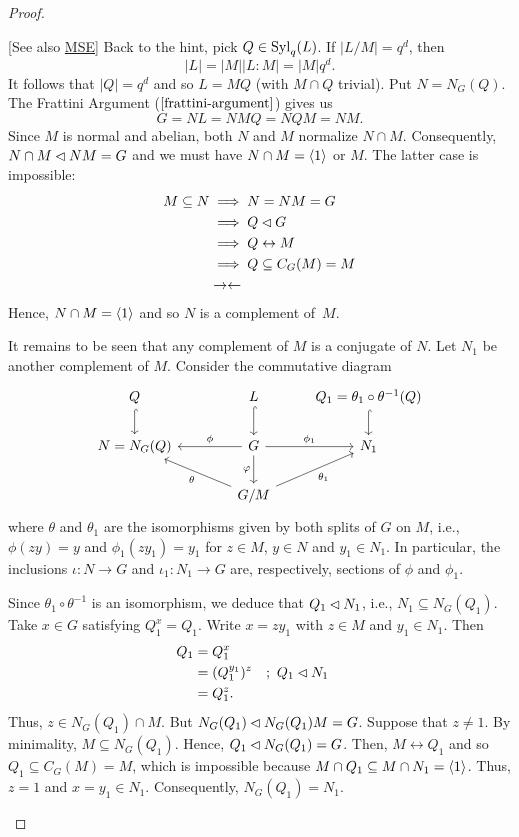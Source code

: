 \begin{proof}
\begin{solution} {[See also \href{https://math.stackexchange.com/a/617987/269050}{MSE}]}
Back to the hint, pick $Q\in{\rm Syl}_q(L)$. If $|L/M|=q^d$, then
$$
    |L| = |M||L:M| = |M|q^d.
$$
It follows that $|Q|=q^d$ and so $L=MQ$ (with $M\cap Q$ trivial). Put $N=N_G(Q)$. The Frattini Argument ($\ref{frattini-argument}$) gives us
$$
    G=NL=NMQ= NQM= NM.
$$
Since $M$ is normal and abelian, both $N$ and $M$ normalize $N\cap M$. Consequently, $N\cap M\lhd NM=G$ and we must have $N\cap M=\langle1\rangle$ or $M$. The latter case is impossible:
\begin{align*}
    M \subseteq N &\implies N=NM=G\\
        &\implies Q\lhd G\\
        &\implies Q\leftrightarrow M\\
        &\implies Q\subseteq C_G(M)=M\\
        &\to\leftarrow
\end{align*}
Hence, $N\cap M=\langle1\rangle$ and so $N$ is a complement of~$M$. 

It remains to be seen that any complement of $M$ is a conjugate of $N$. Let $N_1$ be another complement of $M$. Consider the commutative diagram
$$
    \begin{tikzcd}
        Q \arrow[d, hook] &[0.2in] L \arrow[d, hook]
            & Q_1=\theta_1\circ\theta^{-1}(Q) \arrow[d, hook] \\
        N=N_G(Q)
            & G \arrow[d, "\varphi"'] \arrow[r, "\phi_1"] \arrow[l, "\phi"']
            & N_1\\
            & G/M \arrow[ru, "\theta_1"'] \arrow[lu, "\theta"]
    \end{tikzcd}
$$
where $\theta$ and $\theta_1$ are the isomorphisms given by both splits of $G$ on $M$, i.e., $\phi(zy)=y$ and $\phi_1(zy_1)=y_1$ for $z\in M$, $y\in N$ and $y_1\in N_1$. In particular, the inclusions $\iota\colon N\to G$ and $\iota_1\colon N_1\to G$ are, respectively, sections of $\phi$ and $\phi_1$.

Since $\theta_1\circ\theta^{-1}$ is an isomorphism, we deduce that $Q_1\lhd N_1$, i.e., $N_1\subseteq N_G(Q_1)$. Take $x\in G$ satisfying $Q_1^x=Q_1$. Write $x=zy_1$ with $z\in M$ and $y_1\in N_1$. Then
\begin{align*}
    Q_1 &= Q_1^x\\
        &= (Q_1^{y_1})^z    &&;\ Q_1\lhd N_1\\
        &= Q_1^z.
\end{align*}
Thus, $z\in N_G(Q_1)\cap M$. But $N_G(Q_1)\lhd N_G(Q_1)M=G$. Suppose that $z\ne1$. By minimality, $M\subseteq N_G(Q_1)$. Hence, $Q_1\lhd N_G(Q_1)=G$. Then, $M\leftrightarrow Q_1$ and so $Q_1\subseteq C_G(M)=M$, which is impossible because $M\cap Q_1\subseteq M\cap N_1=\langle1\rangle$. Thus, $z=1$ and $x=y_1\in N_1$. Consequently, $N_G(Q_1)=N_1$.


\end{solution}
\end{proof}

